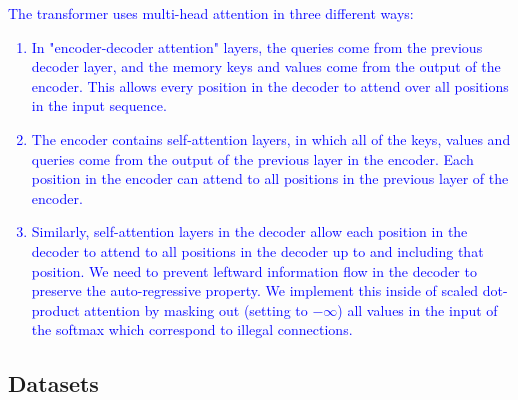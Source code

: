 \documentclass{article}
\begin{document}
	\textcolor{blue}{
		The transformer uses multi-head attention in three different ways:
		\begin{enumerate}
			\item In "encoder-decoder attention" layers, the queries come from the previous decoder layer, 
			and the memory keys and values come from the output of the encoder. This allows every 
			position 
			in the decoder to attend over all positions in the input sequence.
			\item The encoder contains self-attention layers, in which all of the keys, values 
			and queries come from the output of the previous layer in the encoder. 
			Each position in the encoder can attend to all positions in the previous layer of the encoder.
			\item Similarly, self-attention layers in the decoder allow each position in the decoder to attend 
			to 
			all positions in the decoder up to and including that position. We need to prevent leftward 
			information flow in the decoder to preserve the auto-regressive property. We implement this 
			inside of scaled dot-product attention by masking out (setting to $-\infty$) all values in the 
			input 
			of the softmax which correspond to illegal connections. 
		\end{enumerate}
	}


	\subsection{Datasets} \label{subsec:app_dataset}
		
\end{document}
